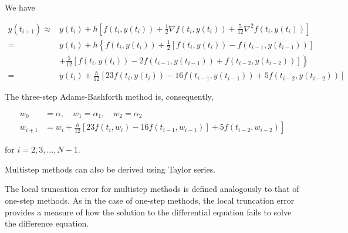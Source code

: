 \begin{mysolution}
We have

$$
\begin{aligned}
y\left(t_{i+1}\right) \approx & y\left(t_{i}\right)+h\left[f\left(t_{i}, y\left(t_{i}\right)\right)+\frac{1}{2} \nabla f\left(t_{i}, y\left(t_{i}\right)\right)+\frac{5}{12} \nabla^{2} f\left(t_{i}, y\left(t_{i}\right)\right)\right] \\
= & y\left(t_{i}\right)+h\left\{f\left(t_{i}, y\left(t_{i}\right)\right)+\frac{1}{2}\left[f\left(t_{i}, y\left(t_{i}\right)\right)-f\left(t_{i-1}, y\left(t_{i-1}\right)\right)\right]\right. \\
& \left.+\frac{5}{12}\left[f\left(t_{i}, y\left(t_{i}\right)\right)-2 f\left(t_{i-1}, y\left(t_{i-1}\right)\right)+f\left(t_{i-2}, y\left(t_{i-2}\right)\right)\right]\right\} \\
= & y\left(t_{i}\right)+\frac{h}{12}\left[23 f\left(t_{i}, y\left(t_{i}\right)\right)-16 f\left(t_{i-1}, y\left(t_{i-1}\right)\right)+5 f\left(t_{i-2}, y\left(t_{i-2}\right)\right)\right]
\end{aligned}
$$

The three-step Adams-Bashforth method is, consequently,

$$
\begin{aligned}
w_{0} & =\alpha, \quad w_{1}=\alpha_{1}, \quad w_{2}=\alpha_{2} \\
w_{i+1} & \left.=w_{i}+\frac{h}{12}\left[23 f\left(t_{i}, w_{i}\right)-16 f\left(t_{i-1}, w_{i-1}\right)\right]+5 f\left(t_{i-2}, w_{i-2}\right)\right]
\end{aligned}
$$

for $i=2,3, \ldots, N-1$.
\end{mysolution}

Multistep methods can also be derived using Taylor series. 

The local truncation error for multistep methods is defined analogously to that of one-step methods. As in the case of one-step methods, the local truncation error provides a measure of how the solution to the differential equation fails to solve the difference equation.

